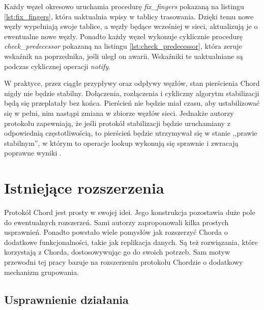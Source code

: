 \documentclass[12pt, twoside, openany]{report}
\begin{document}


Każdy węzeł okresowo uruchamia procedurę \textit{fix\_fingers} pokazaną na listingu \ref{lst:fix_fingers}, która uaktualnia wpisy w tablicy trasowania. Dzięki temu nowe węzły wypełniają swoje tablice, a węzły będące wcześniej w sieci, aktualizują je o ewentualne nowe węzły. Ponadto każdy węzeł wykonuje cyklicznie procedurę \textit{check\_predecessor} pokazaną na listingu \ref{lst:check_predecessor}, która zeruje wskaźnik na poprzednika, jeśli uległ on awarii. Wskaźniki te uaktualniane są podczas cyklicznej operacji \textit{notify}.

W praktyce, przez ciągłe przypływy oraz odpływy węzłów, stan pierścienia Chord nigdy nie będzie stabilny. Dołączenia, rozłączenia i cykliczny algorytm stabilizacji będą się przeplatały bez końca. Pierścień nie będzie miał czasu, aby ustabilizować się w pełni, nim nastąpi zmiana w zbiorze węzłów sieci. Jednakże autorzy protokołu zapewniają, że jeśli protokół stabilizacji będzie uruchamiany z odpowiednią częstotliwością, to pierścień będzie utrzymywał się w stanie ,,prawie stabilnym'', w którym to operacje lookup wykonują się sprawnie i zwracają poprawne wyniki \cite{bib:chord}.

\section{Istniejące rozszerzenia}

Protokół Chord jest prosty w swojej idei. Jego konstrukcja pozostawia duże pole do ewentualnych rozszerzeń. Sami autorzy zaproponowali kilka prostych usprawnień. Ponadto powstało wiele pomysłów jak rozszerzyć Chorda o dodatkowe funkcjonalności, takie jak replikacja danych. Są też rozwiązania, które korzystają z Chorda, dostosowywując go do swoich potrzeb. Sam motyw przewodni tej pracy bazuje na rozszerzeniu protokołu Chordzie o dodatkowy mechanizm grupowania.

\subsection{Usprawnienie działania}
\end{document}
